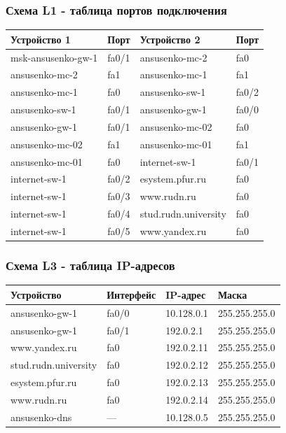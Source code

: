 \begin{frame}
\frametitle{Схема L1 - таблица портов подключения}
\begin{center}
\small
\begin{tabular}{|l|l|l|l|}
\hline
\textbf{Устройство 1} & \textbf{Порт} & \textbf{Устройство 2} & \textbf{Порт} \\
\hline
msk-ansusenko-gw-1 & fa0/1 & ansusenko-mc-2 & fa0 \\
ansusenko-mc-2 & fa1 & ansusenko-mc-1 & fa1
\\
ansusenko-mc-1 & fa0 & ansusenko-sw-1 & fa0/2 \\
ansusenko-sw-1 & fa0/1 & ansusenko-gw-1 & fa0/0 \\
ansusenko-gw-1 & fa0/1 & ansusenko-mc-02 & fa0 \\
ansusenko-mc-02 & fa1 & ansusenko-mc-01 & fa1 \\
ansusenko-mc-01 & fa0 & internet-sw-1 & fa0/1 \\
internet-sw-1 & fa0/2 & esystem.pfur.ru & fa0 \\
internet-sw-1 & fa0/3 & www.rudn.ru & fa0 \\
internet-sw-1 & fa0/4 & stud.rudn.university & fa0 \\
internet-sw-1 & fa0/5 & www.yandex.ru & fa0 \\
\hline
\end{tabular}
\end{center}
\end{frame}

\begin{frame}
\frametitle{Схема L3 - таблица IP-адресов}
\begin{center}
\small
\begin{tabular}{|l|l|l|l|}
\hline
\textbf{Устройство} & \textbf{Интерфейс} & \textbf{IP-адрес} & \textbf{Маска} \\
\hline
ansusenko-gw-1 & fa0/0 & 10.128.0.1 & 255.255.255.0 \\
ansusenko-gw-1 & fa0/1 & 192.0.2.1 & 255.255.255.0 \\
www.yandex.ru & fa0 & 192.0.2.11 & 255.255.255.0 \\
stud.rudn.university & fa0 & 192.0.2.12 & 255.255.255.0 \\
esystem.pfur.ru & fa0 & 192.0.2.13 & 255.255.255.0 \\
www.rudn.ru & fa0 & 192.0.2.14 & 255.255.255.0 \\
ansusenko-dns & — & 10.128.0.5 & 255.255.255.0 \\
\hline
\end{tabular}
\end{center}
\end{frame}


